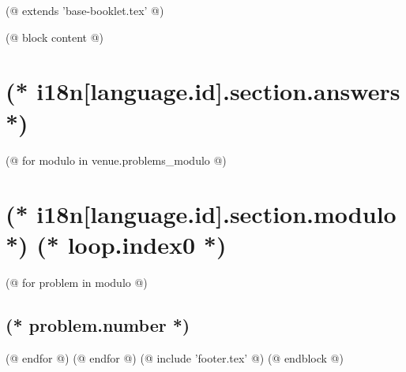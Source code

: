 (@ extends 'base-booklet.tex' @)

(@ block content @)
    \thispagestyle{first}
    \afterpage{\globaldefs=1\restoregeometry}

    \vspace*{19mm}

    \section{(* i18n[language.id].section.answers *)}
    \pagestyle{answers}
    (@ for modulo in venue.problems_modulo @)
        \newpage%
        \section{(* i18n[language.id].section.modulo *) (* loop.index0 *)}
        (@ for problem in modulo @)%
            \setcounter{volume}{(* volume.number *)}%
            \setcounter{problem}{(* problem.number *)}%
            \subsection{(* problem.number *)}%
        (@ endfor @)
    (@ endfor @)
    (@ include 'footer.tex' @)
(@ endblock @)

